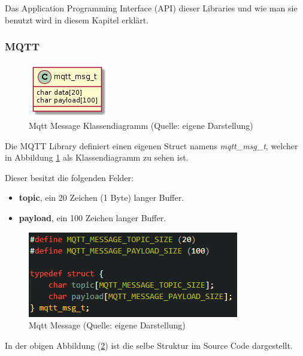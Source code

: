 Das Application Programming Interface (API) dieser Libraries und wie man sie benutzt wird in diesem Kapitel erklärt.

\subsubsection{MQTT}\label{sec:own-libraries-mqtt}

\begin{figure}[H]
    \begin{center}
        \includegraphics[scale=1]{diagrams/mqtt_msg_t.png}
        \caption{Mqtt Message Klassendiagramm (Quelle: eigene Darstellung)}
        \label{abb:mqtt_msg_t_diagram}
    \end{center}    
\end{figure}

Die MQTT Library definiert einen eigenen Struct namens \textit{mqtt\_msg\_t}, welcher in Abbildung \ref{abb:mqtt_msg_t_diagram} als Klassendiagramm zu sehen ist.

Dieser besitzt die folgenden Felder:

\begin{itemize}
    \item \textbf{topic}, ein 20 Zeichen (1 Byte) langer Buffer.
    \item \textbf{payload}, ein 100 Zeichen langer Buffer.
\end{itemize}

\begin{figure}[H]
    \begin{center}
        \includegraphics[scale=1]{images/mqtt_msg_t.png}
        \caption{Mqtt Message (Quelle: eigene Darstellung)}
        \label{abb:mqtt_msg_t}
    \end{center}
\end{figure}

In der obigen Abbildung (\ref{abb:mqtt_msg_t}) ist die selbe Struktur im Source Code dargestellt.

